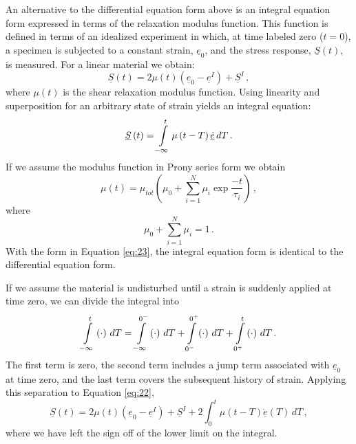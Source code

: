 An alternative to the differential equation form above is an integral
equation form expressed in terms of the relaxation modulus function.
This function is defined in terms of an idealized experiment in which,
at time labeled zero ($t=0$), a specimen is subjected to a constant
strain, $\underline{e}_{0}$, and the stress response, $\underline{S}\left(t\right)$,
is measured. For a linear material we obtain:
\begin{equation}
\underline{S}\left(t\right)=2\mu\left(t\right)\left(\underline{e}_{0}-\underline{e}^{I}\right)+\underline{S}^{I}\,,\label{eq:21}
\end{equation}
where $\mu\left(t\right)$ is the shear relaxation modulus function.
Using linearity and superposition for an arbitrary state of strain
yields an integral equation:
\begin{equation}
\underline{S}\left(t\right)=\intop_{-\infty}^{t}\mu\left(t-T\right)\underline{\dot{e}}\, dT\,.\label{eq:22}
\end{equation}
If we assume the modulus function in Prony series form we obtain
\begin{equation}
\mu\left(t\right)=\mu_{tot}\left(\mu_{0}+\sum_{i=1}^{N}\mu_{i}\exp\frac{-t}{\tau_{i}}\right)\,,\label{eq:23}
\end{equation}
where
\begin{equation}
\mu_{0}+\sum_{i=1}^{N}\mu_{i}=1\,.\label{eq:24}
\end{equation}
With the form in Equation \vref{eq:23}, the integral equation form
is identical to the differential equation form.

If we assume the material is undisturbed until a strain is suddenly
applied at time zero, we can divide the integral into
\begin{equation}
\intop_{-\infty}^{t}\left(\cdot\right)\, dT=\intop_{-\infty}^{0^{-}}\left(\cdot\right)\, dT+\intop_{0^{-}}^{0^{+}}\left(\cdot\right)\, dT+\intop_{0^{+}}^{t}\left(\cdot\right)\, dT\,.\label{eq:27}
\end{equation}
The first term is zero, the second term includes a jump term associated
with $\underline{e}_{0}$ at time zero, and the last term covers the
subsequent history of strain. Applying this separation to Equation
\vref{eq:22},
\begin{equation}
\underline{S}\left(t\right)=2\mu\left(t\right)\left(\underline{e}_{0}-\underline{e}^{I}\right)+\underline{S}^{I}+2\int_{0}^{t}\mu\left(t-T\right)\underline{\dot{e}}\left(T\right)\, dT\,,\label{eq:28}
\end{equation}
where we have left the sign off of the lower limit on the integral.


